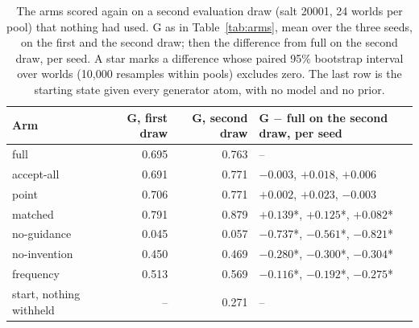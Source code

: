 \begin{table}[t]
\centering
\caption{The arms scored again on a second evaluation draw (salt 20001, 24 worlds per pool) that nothing had used. G as in Table~\ref{tab:arms}, mean over the three seeds, on the first and the second draw; then the difference from full on the second draw, per seed. A star marks a difference whose paired 95\% bootstrap interval over worlds (10,000 resamples within pools) excludes zero. The last row is the starting state given every generator atom, with no model and no prior.}
\label{tab:seconddraw}
\small
\begin{tabular}{lrrl}
\toprule
Arm & G, first draw & G, second draw & G $-$ full on the second draw, per seed \\
\midrule
full & 0.695 & 0.763 & -- \\
accept-all & 0.691 & 0.771 & $-0.003$, $+0.018$, $+0.006$ \\
point & 0.706 & 0.771 & $+0.002$, $+0.023$, $-0.003$ \\
matched & 0.791 & 0.879 & $+0.139$*, $+0.125$*, $+0.082$* \\
no-guidance & 0.045 & 0.057 & $-0.737$*, $-0.561$*, $-0.821$* \\
no-invention & 0.450 & 0.469 & $-0.280$*, $-0.300$*, $-0.304$* \\
frequency & 0.513 & 0.569 & $-0.116$*, $-0.192$*, $-0.275$* \\
start, nothing withheld & -- & 0.271 & -- \\
\bottomrule
\end{tabular}
\end{table}
